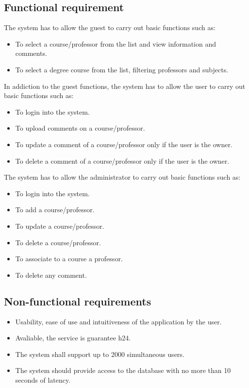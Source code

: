 \documentclass[a4paper, oneside]{article}
\begin{document}
\subsection{Functional requirement}
The system has to allow the guest to carry out basic functions such as:
\begin{itemize}
\item To select a course/professor from the list and view information and comments.
\item To select a degree course from the list, filtering professors and subjects.
\end{itemize}
In addiction to the guest functions, the system has to allow the user to carry out basic functions such as:
\begin{itemize}
\item To login into the system.
\item To upload comments on a course/professor.
\item To update a comment of a course/professor only if the user is the owner.
\item To delete a comment of a course/professor only if the user is the owner.
\end{itemize}
\vspace{2mm}
The system has to allow the administrator to carry out basic functions such as:
\begin{itemize}
\item To login into the system.
\item To add a course/professor.
\item To update a course/professor.
\item To delete a course/professor.
\item To associate to a course a professor.
\item To delete any comment.
\end{itemize}
\vspace{2mm}

\subsection{Non-functional requirements}
\begin{itemize}
\item Usability, ease of use and intuitiveness of the application by the user.
\item Avaliable, the service is guarantee h24.
\item The system shall support up to 2000 simultaneous users.
\item The system should provide access to the database with no more than 10 seconds of latency.
\end{itemize}
\end{document}
